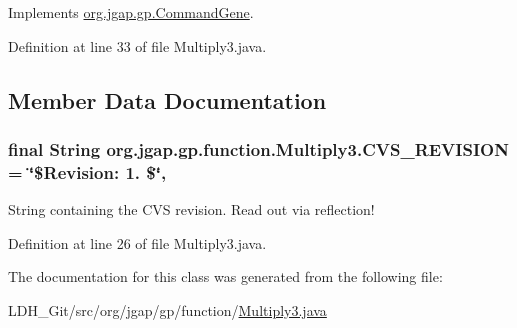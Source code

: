Implements \hyperlink{classorg_1_1jgap_1_1gp_1_1_command_gene_a236141d99059da808afe7a9217e411c7}{org.\-jgap.\-gp.\-Command\-Gene}.



Definition at line 33 of file Multiply3.\-java.



\subsection{Member Data Documentation}
\hypertarget{classorg_1_1jgap_1_1gp_1_1function_1_1_multiply3_af10f1a047f839850118149852e93decd}{
\subsubsection[{C\-V\-S\-\_\-\-R\-E\-V\-I\-S\-I\-O\-N}]{\setlength{\rightskip}{0pt plus 5cm}final String org.\-jgap.\-gp.\-function.\-Multiply3.\-C\-V\-S\-\_\-\-R\-E\-V\-I\-S\-I\-O\-N = \char`\"{}\$Revision\-: 1. \$\char`\"{}\hspace{0.3cm}{\ttfamily [static]}, {\ttfamily [private]}}}\label{classorg_1_1jgap_1_1gp_1_1function_1_1_multiply3_af10f1a047f839850118149852e93decd}
String containing the C\-V\-S revision. Read out via reflection! 

Definition at line 26 of file Multiply3.\-java.



The documentation for this class was generated from the following file\-:\begin{DoxyCompactItemize}
\item 
L\-D\-H\-\_\-\-Git/src/org/jgap/gp/function/\hyperlink{_multiply3_8java}{Multiply3.\-java}\end{DoxyCompactItemize}
